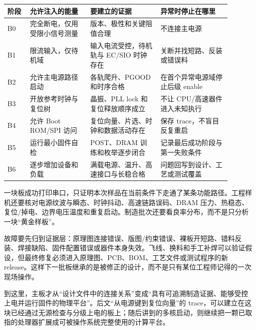 \begin{longtable}{L{0.09\linewidth}L{0.24\linewidth}L{0.29\linewidth}L{0.28\linewidth}}
\toprule
阶段 & 允许注入的能量 & 要建立的证据 & 异常时停止在哪里 \\
\midrule
B0 & 完全断电，仅用受限小信号测量 & 版本、极性和关键阻值合理 & 不连接主电源 \\\tablerowrule
B1 & 限流输入，仅待机域 & 输入电流受控，待机轨与 EC/SIO 时钟存在 & 关断并找短路、反装或错误料 \\\tablerowrule
B2 & 允许主电源路径启动 & 各轨爬升、PGOOD 和时序合格 & 在首个异常电源域停止后级 enable \\\tablerowrule
B3 & 开放参考时钟与复位树 & 晶振、PLL lock 和复位释放顺序成立 & 不让 CPU/高速器件进入未知执行 \\\tablerowrule
B4 & 允许 Boot ROM/SPI 访问 & 复位向量、片选、时钟和数据活动存在 & 保存 trace，不盲目反复重启 \\\tablerowrule
B5 & 运行最小固件自检 & POST、DRAM 训练和枚举逐步闭合 & 记录最后成功阶段与第一失败条件 \\\tablerowrule
B6 & 逐步增加设备和负载 & 满载电源、温升、高速接口与长稳合格 & 问题回写到设计、工艺或测试覆盖 \\
\bottomrule
\end{longtable}


一块板成功打印串口，只证明本次样品在当前条件下走通了某条功能路径。工程样机还要核对电源纹波与瞬态、时钟抖动、高速链路误码、DRAM 压力、热稳态、复位/掉电、边界电压温度和重复启动。制造批次还要看良率分布，而不是只分析一块“黄金样板”。

故障要先归到证据层：原理图连接错误、版图/约束错误、裸板开短路、错料反装、焊接缺陷、固件配置错误或器件本身失效。飞线、换料和手工补焊可以验证假设，但最终修复必须进入原理图、PCB、BOM、工艺文件或测试程序的新 release。这样下一批板继承的是被修正的设计，而不是只有某位工程师记得的一次现场操作。

到这里，主板才从“设计文件中的连接关系”变成“具有可追溯制造证据、能够受控上电并运行固件的物理平台”。后文“从电源键到复位向量”的 trace，可以建立在这块已经通过无源检查与分级上电的板上；随后讲到的多核启动，则继续把一颗已取指的处理器扩展成可被操作系统完整使用的计算平台。

